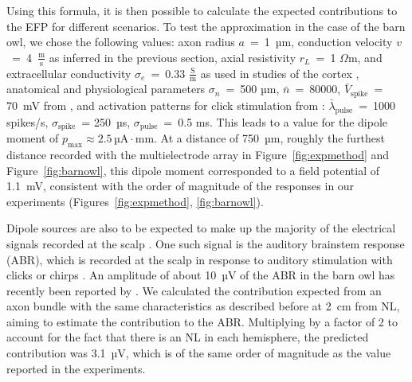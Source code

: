 \documentclass[]{elife}
\begin{document}
Using this formula, it is then possible to calculate the expected
contributions to the EFP for different scenarios. To test the
approximation in the case of the barn owl, we chose the following
values: axon radius \(a\)~=~1~µm, conduction velocity
\(v\)~=~4~\(\frac{\text{m}}{\text{s}}\) as inferred in the previous
section, axial resistivity \(r_L\)~=~1 \(\Omega\text{m}\), and
extracellular conductivity \(\sigma_e\)~=~0.33
\(\frac{\text{S}}{\text{m}}\) as used in studies of the cortex
\citep{Gold2006Origin, Holt1999Electrical}, anatomical and physiological
parameters \(\sigma_n\)~=~500 µm, \(\bar{n}\)~=~80000,
\(\bar{V}_{\text{spike}}\)~= 70~mV from \citep{carr90}, and activation
patterns for click stimulation from \citep{koppl97a, Carr2016Role}:
\(\bar{\lambda}_\text{pulse}\)~=~1000 spikes/s,
\(\sigma_\text{spike}\)~= 250~µs, \(\sigma_\text{pulse}\)~=~0.5 ms. This
leads to a value for the dipole moment of
\(p_\text{max} \approx 2.5\, \text{µA}\cdot\text{mm}\). At a distance of
750~µm, roughly the furthest distance recorded with the multielectrode
array in Figure~\ref{fig:expmethod} and Figure~\ref{fig:barnowl}, this
dipole moment corresponded to a field potential of 1.1~mV, consistent
with the order of magnitude of the responses in our experiments
(Figures~\ref{fig:expmethod}, \ref{fig:barnowl}).

Dipole sources are also to be expected to make up the majority of the
electrical signals recorded at the scalp \citep{Nunez2006Electric}. One
such signal is the auditory brainstem response (ABR), which is recorded
at the scalp in response to auditory stimulation with clicks or chirps
\citep{Riedel2002Comparison}. An amplitude of about 10~µV of the ABR in
the barn owl has recently been reported by
\citet{PalancaCastan2016Binaural}. We calculated the contribution
expected from an axon bundle with the same characteristics as described
before at 2~cm from NL, aiming to estimate the contribution to the ABR.
Multiplying by a factor of 2 to account for the fact that there is an NL
in each hemisphere, the predicted contribution was 3.1~µV, which is of
the same order of magnitude as the value reported in the experiments.
\end{document}

